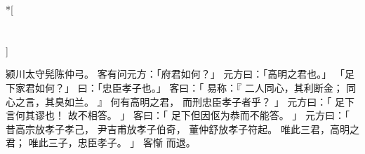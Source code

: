 
\switchcolumn[0]*[\section{}]

颍川太守髡陈仲弓。
客有问元方：「府君如何？」
元方曰：「高明之君也。」
「足下家君如何？」
曰：「忠臣孝子也。」
客曰：「
    易称：『
        二人同心，其利断金；
        同心之言，其臭如兰。
    』
    何有高明之君，
    而刑忠臣孝子者乎？
」
元方曰：「
    足下言何其谬也！
    故不相答。
」
客曰：「
    足下但因伛为恭而不能答。
」
元方曰：「
    昔高宗放孝子孝己，
    尹吉甫放孝子伯奇，
    董仲舒放孝子符起。
    唯此三君，高明之君；
    唯此三子，忠臣孝子。
」
客惭
而退。

\switchcolumn




